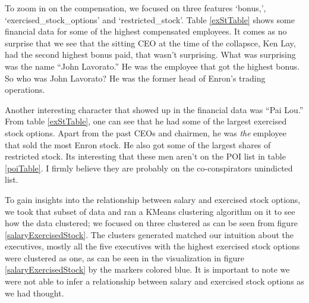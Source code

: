\documentclass[twoside,openright,titlepage,numbers=noenddot,headinclude,%
               footinclude=true,cleardoublepage=empty,abstractoff,BCOR=5mm,%
               paper=a4,fontsize=11pt,ngerman,american]{scrreprt}
\numberwithin{theorem}{chapter}
\numberwithin{definition}{chapter}
\numberwithin{algorithm}{chapter}
\numberwithin{figure}{chapter}
\numberwithin{table}{chapter}
\numberwithin{equation}{chapter}
\begin{document}
To zoom in on the compensation, we focused on three features `bonus,', `exercised\_stock\_options' and `restricted\_stock'. Table \ref{exStTable} shows some financial data for some of the highest compensated employees. It comes as no surprise that we see that the sitting CEO at the time of the collapsce, Ken Lay, had the second highest bonus paid, that wasn't surprising. What was surprising was the name ``John Lavorato.'' He was the employee that got the highest bonus. So who was John Lavorato? He was the former head of Enron's trading operations. 

Another interesting character that showed up in the financial data was ``Pai Lou.'' From table \ref{exStTable}, one can see that he had some of the largest exercised stock options. Apart from the past CEOs and chairmen, he was \textit{the} employee that sold the most Enron stock. He also got some of the largest shares of restricted stock. Its interesting that these men aren't on the POI list in table \ref{poiTable}. I firmly believe they are probably on the co-conspirators unindicted list.

To gain insights into the relationship between salary and exercised stock options, we took that subset of data and ran a KMeans clustering algorithm on it to see how the data clustered; we focused on three clustered as can be seen from figure \ref{salaryExercisedStock}. The clusters generated matched our intuition about the executives, mostly all the five executives with the highest exercised stock options were clustered as one, as can be seen in the visualization in figure \ref{salaryExercisedStock} by the markers colored blue. It is important to note we were not able to infer a relationship between salary and exercised stock options as we had thought. 
\end{document}
